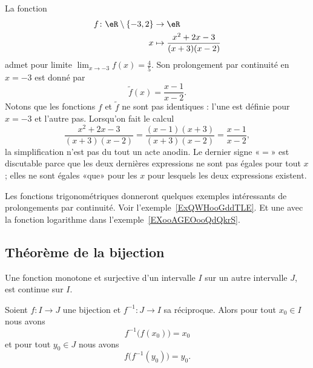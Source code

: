 \begin{example}
	La fonction
	\begin{equation}
		\begin{aligned}
			f\colon \eR\setminus\{ -3,2 \} & \to \eR                                  \\
			x                              & \mapsto  \frac{ x^2+2x-3 }{ (x+3)(x-2) }
		\end{aligned}
	\end{equation}
	admet pour limite \( \lim_{x\to -3} f(x)=\frac{ 4 }{ 5 }\). Son prolongement par continuité en \( x=-3\) est donné par
	\begin{equation}
		\tilde f(x)=\frac{ x-1 }{ x-2 }.
	\end{equation}
	Notons que les fonctions \( f\) et \( \tilde f\) ne sont pas identiques : l'une est définie pour \( x=-3\) et l'autre pas. Lorsqu'on fait le calcul
	\begin{equation}
		\frac{ x^2+2x-3 }{ (x+3)(x-2) }=\frac{ (x-1)(x+3) }{ (x+3)(x-2) }=\frac{ x-1 }{ x-2 },
	\end{equation}
	la simplification n'est pas du tout un acte anodin. Le dernier signe «\( =\)» est discutable parce que les deux dernières expressions ne sont pas égales pour tout \( x\); elles ne sont égales «que» pour les \( x\) pour lesquels les deux expressions existent.
\end{example}

Les fonctions trigonométriques donneront quelques exemples intéressants de prolongements par continuité. Voir l'exemple~\ref{ExQWHooGddTLE}. Et une avec la fonction logarithme dans l'exemple~\ref{EXooAGEOooQdQkrS}.

\subsection{Théorème de la bijection}

\begin{proposition} \label{PropOARooUuCaYT}
	Une fonction monotone et surjective d'un intervalle \( I\) sur un autre intervalle \( J\), est continue sur \( I\).
\end{proposition}

\begin{proposition}
	Soient \( f\colon I\to J\) une bijection et \( f^{-1}\colon J\to I\) sa réciproque. Alors pour tout \( x_0\in I\) nous avons
	\begin{equation}    \label{EqHQRooNmLYbF}
		f^{-1}\big( f(x_0) \big)=x_0
	\end{equation}
	et pour tout \( y_0\in J\) nous avons
	\begin{equation}    \label{EqIYTooQPvZDr}
		f\big( f^{-1}(y_0) \big)=y_0.
	\end{equation}
\end{proposition}

